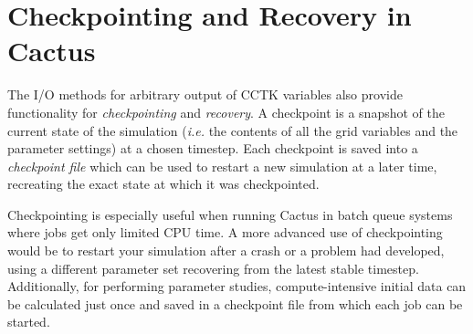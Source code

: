 \documentclass{article}
\begin{document}
\section{Checkpointing and Recovery in Cactus}
\label{cp_recovery}

The I/O methods for arbitrary output of CCTK variables also provide functionality for {\it checkpointing}
and {\it recovery}. A checkpoint is a snapshot of the current state of the
simulation ({\it i.e.} the contents of all the grid variables and the parameter
settings) at a chosen timestep. Each checkpoint is saved into a
{\it checkpoint file} which can be used to restart a new simulation at a later
time, recreating the exact state at which it was checkpointed.

Checkpointing is especially useful when running Cactus in batch queue systems
where jobs get only limited CPU time. A more advanced use of checkpointing
would be to restart your simulation after a crash or a problem had developed,
using a  different parameter set recovering from the latest stable timestep.
Additionally, for performing parameter studies,  compute-intensive
initial data can be calculated just once and saved in a checkpoint file
from which each job can be started.
\end{document}
